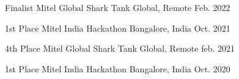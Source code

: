 
\begin{cvhonors}

  \cvhonor
    {Finalist} %
    {Mitel Global Shark Tank} %
    {Global, Remote} %
    {Feb. 2022} %

    
  \cvhonor
    {1st Place} %
    {Mitel India Hackathon} %
    {Bangalore, India} %
    {Oct. 2021} %

  \cvhonor
    {4th Place} %
    {Mitel Global Shark Tank} %
    {Global, Remote} %
    {feb. 2021} %
    
  \cvhonor
    {1st Place} %
    {Mitel India Hackathon} %
    {Bangalore, India} %
    {Oct. 2020} %
    
\end{cvhonors}
